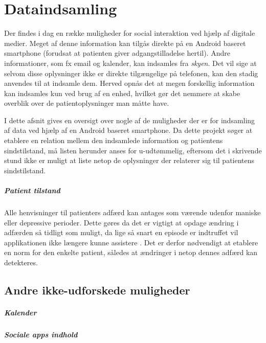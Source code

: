 \chapter{Dataindsamling}
Der findes i dag en række muligheder for social interaktion ved hjælp af digitale medier.
Meget af denne information kan tilgås direkte på en Android baseret smartphone (forudsat at patienten giver adgangstilladelse hertil).
Andre informationer, som fx email og kalender, kan indsamles fra \textit{skyen}.
Det vil sige at selvom disse oplysninger ikke er direkte tilgængelige på telefonen, kan den stadig anvendes til at indsamle dem.
Herved opnås det at megen forskellig information kan indsamles kun ved brug af en enhed, hvilket gør det nemmere at skabe overblik over de patientoplysninger man måtte have.

I dette afsnit gives en oversigt over nogle af de muligheder der er for indsamling af data ved hjælp af en Android baseret smartphone.
Da dette projekt søger at etablere en relation mellem den indsamlede information og patientens sindstilstand, må listen herunder anses for u-udtømmelig, eftersom det i skrivende stund ikke er muligt at liste netop de oplysninger der relaterer sig til patientens sindstilstand.

\paragraph{Patient tilstand}
Alle henvisninger til patienters adfærd kan antages som værende udenfor maniske eller depressive perioder.
Dette gøres da det er vigtigt at opdage ændring i adfærden så tidligt som muligt, da lige så snart en episode er indtruffet vil applikationen ikke længere kunne assistere .
Det er derfor nødvendigt at etablere en norm for den enkelte patient, således at ændringer i netop dennes adfærd kan detekteres.







\section{Andre ikke-udforskede muligheder}

\paragraph{Kalender}

\paragraph{Sociale apps indhold}
